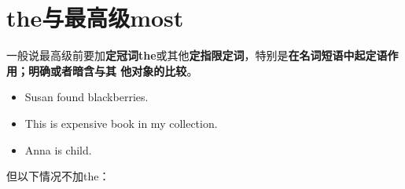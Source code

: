 \section{the与最高级most}
\label{sec:themost}

一般说最高级前要加\textbf{定冠词the}或其他\textbf{定指限定词}，特别是\textbf{在名词短语中起定语作用；明确或者暗含与其
  他对象的比较}。
\begin{itemize}
\item Susan found  blackberries.
\item This is  expensive book in my collection.

\item Anna is  child.
\end{itemize}


但以下情况不加the：

